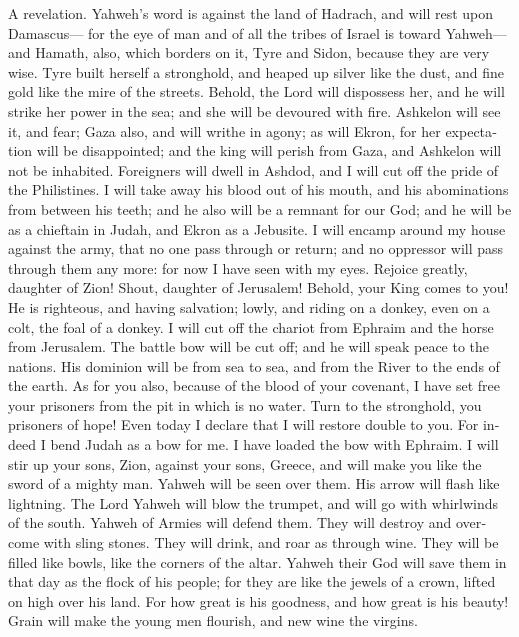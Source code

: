 \begin{paracol}{2}
\begin{otherlanguage}{english}
 A revelation. Yahweh's word is against the land of
Hadrach, and will rest upon Damascus--- for the eye of man and of all
the tribes of Israel is toward Yahweh---  and Hamath,
also, which borders on it, Tyre and Sidon, because they are very wise.
 Tyre built herself a stronghold, and heaped up silver
like the dust, and fine gold like the mire of the streets.
 Behold, the Lord will dispossess her, and he will strike
her power in the sea; and she will be devoured with fire. 
Ashkelon will see it, and fear; Gaza also, and will writhe in agony; as
will Ekron, for her expectation will be disappointed; and the king will
perish from Gaza, and Ashkelon will not be inhabited. 
Foreigners will dwell in Ashdod, and I will cut off the pride of the
Philistines.  I will take away his blood out of his mouth,
and his abominations from between his teeth; and he also will be a
remnant for our God; and he will be as a chieftain in Judah, and Ekron
as a Jebusite.  I will encamp around my house against the
army, that no one pass through or return; and no oppressor will pass
through them any more: for now I have seen with my eyes. 
Rejoice greatly, daughter of Zion! Shout, daughter of Jerusalem! Behold,
your King comes to you! He is righteous, and having salvation; lowly,
and riding on a donkey, even on a colt, the foal of a donkey.
 I will cut off the chariot from Ephraim and the horse
from Jerusalem. The battle bow will be cut off; and he will speak peace
to the nations. His dominion will be from sea to sea, and from the River
to the ends of the earth.  As for you also, because of
the blood of your covenant, I have set free your prisoners from the pit
in which is no water.  Turn to the stronghold, you
prisoners of hope! Even today I declare that I will restore double to
you.  For indeed I bend Judah as a bow for me. I have
loaded the bow with Ephraim. I will stir up your sons, Zion, against
your sons, Greece, and will make you like the sword of a mighty man.
 Yahweh will be seen over them. His arrow will flash like
lightning. The Lord Yahweh will blow the trumpet, and will go with
whirlwinds of the south.  Yahweh of Armies will defend
them. They will destroy and overcome with sling stones. They will drink,
and roar as through wine. They will be filled like bowls, like the
corners of the altar.  Yahweh their God will save them in
that day as the flock of his people; for they are like the jewels of a
crown, lifted on high over his land.  For how great is
his goodness, and how great is his beauty! Grain will make the young men
flourish, and new wine the virgins.


\end{otherlanguage}
\end{paracol}
